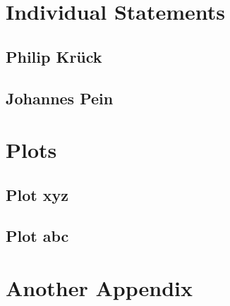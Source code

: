 \documentclass[a4paper, nobind]{templates/ociamthesis}
\newcommand*{\bibtitle}{Works Cited}
\begin{document}
\hypertarget{individual-statements}{%
\chapter{Individual Statements}\label{individual-statements}}

\hypertarget{philip-kruxfcck}{%
\section{Philip Krück}\label{philip-kruxfcck}}

\hypertarget{johannes-pein}{%
\section{Johannes Pein}\label{johannes-pein}}

\startappendices

\hypertarget{plots}{%
\chapter{Plots}\label{plots}}

\hypertarget{plot-xyz}{%
\section{Plot xyz}\label{plot-xyz}}

\hypertarget{plot-abc}{%
\section{Plot abc}\label{plot-abc}}

\hypertarget{another-appendix}{%
\chapter{Another Appendix}\label{another-appendix}}




\setlength{\baselineskip}{0pt} %

{\renewcommand*\MakeUppercase[1]{#1}%
\printbibliography[heading=bibintoc,title={\bibtitle}]}
\end{document}
